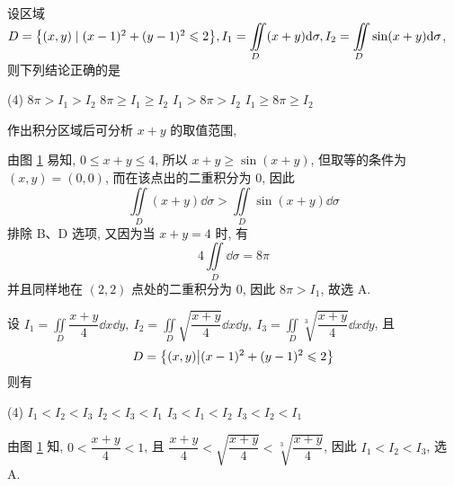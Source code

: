 \begin{example}
    设区域 $D=\qty{(x,y)\mid (x-1)^2+(y-1)^2\leqslant 2},I_1=\displaystyle\iint\limits_D (x+y)\dd \sigma,I_2=\iint\limits_D\sin(x+y)\dd \sigma$, 则下列结论正确的是
    \begin{tasks}(4)
        \task $8\pi>I_1>I_2$
        \task $8\pi\geqslant I_1\geqslant I_2$
        \task $I_1>8\pi>I_2$
        \task $I_1\geqslant 8\pi\geqslant I_2$
    \end{tasks}
\end{example}
\begin{solution}
    作出积分区域后可分析 $x+y$ 的取值范围, \\
    \begin{minipage}{0.29\linewidth}
        \begin{figure}[H]
            \centering
            \caption{}
            \label{tikz_ercjf}
        \end{figure}
    \end{minipage}\hfill
    \begin{minipage}{0.7\linewidth}
        由图 \ref{tikz_ercjf} 易知, $0\leqslant x+y\leqslant 4$, 所以 $x+y\geqslant \sin(x+y)$, 但取等的条件为 $(x,y)=(0,0)$, 而在该点出的二重积分为 0, 因此
        $$\displaystyle\iint\limits_D(x+y)\dd \sigma>\iint\limits_D\sin(x+y)\dd \sigma$$
        排除 B、D 选项, 又因为当 $x+y=4$ 时, 有
        $$4\iint\limits_D\dd \sigma=8\pi$$ 并且同样地在 $(2,2)$ 点处的二重积分为 $0$, 因此 $8\pi>I_1$, 故选 A.
    \end{minipage}
\end{solution}

\begin{example}
    设 $\displaystyle I_1=\iint\limits_D\dfrac{x+y}{4}\dd x\dd y,~I_2=\iint\limits_D\sqrt{\dfrac{x+y}{4}}\dd x\dd y,~I_3=\iint\limits_D\sqrt[3]{\dfrac{x+y}{4}}\dd x\dd y$,
    且 $$D=\qty{(x,y)\big| (x-1)^2+(y-1)^2\leqslant 2}$$
    则有
    \begin{tasks}(4)
        \task $I_1<I_2<I_3$
        \task $I_2<I_3<I_1$
        \task $I_3<I_1<I_2$
        \task $I_3<I_2<I_1$
    \end{tasks}
\end{example}
\begin{solution}
    由图 \ref{tikz_ercjf} 知, $0<\dfrac{x+y}{4}<1$, 且 $\dfrac{x+y}{4}<\sqrt{\dfrac{x+y}{4}}<\sqrt[3]{\dfrac{x+y}{4}}$, 因此 $I_1<I_2<I_3$, 选 A.
\end{solution}

